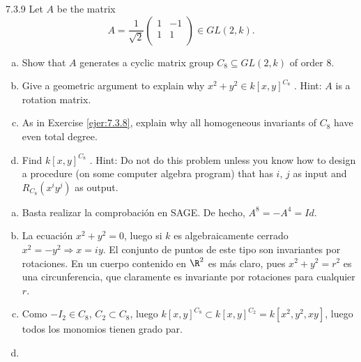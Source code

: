 \documentclass[twoside]{article}
\begin{document}
\begin{ejercicio}{7.3.9}
Let $A$ be the matrix
\[
A =
\frac{1}{\sqrt{2}}\begin{pmatrix}
1 &−1\\
1 &1\\
\end{pmatrix}
∈ GL(2, k).
\]
\begin{enumerate}[a.]
\item Show that $A$ generates a cyclic matrix group $C_8 ⊆ GL(2, k)$ of order 8.
\item Give a geometric argument to explain why $x^2 + y^2 ∈ k[x, y]^{C_8}$ . Hint: $A$ is a rotation
matrix.
\item As in Exercise \ref{ejer:7.3.8}, explain why all homogeneous invariants of $C_8$ have even total
degree.
\item Find $k[x, y]^{C_8}$ . Hint: Do not do this problem unless you know how to design a procedure
(on some computer algebra program) that has $i$, $j$ as input and $R_{C_8} (x^iy^j)$ as
output.
\end{enumerate}
\end{ejercicio}
\begin{solucion}
\begin{enumerate}[a.]
\item Basta realizar la comprobación en SAGE. De hecho, $A^8 = - A^4 = Id$.
\item La ecuación $x^2+y^2=0$, luego si $k$ es algebraicamente cerrado $x^2=-y^2\Rightarrow x=iy$. El conjunto de puntos de este tipo son invariantes por rotaciones. En un cuerpo contenido en $\R^2$ es más claro, pues $x^2+y^2=r^2$ es una circunferencia, que claramente es invariante por rotaciones para cualquier $r$.
\item Como $-I_2 \in C_8$, $C_2 \subset C_8$, luego $k[x,y]^{C_8}\subset k[x,y]^{C_2} = k[x^2,y^2,xy]$, luego todos los monomios tienen grado par.	

\item 
\end{enumerate}
\end{solucion}
\newpage
\end{document}
